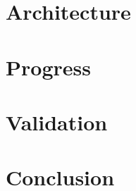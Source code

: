 \documentclass{sig-alternate-05-2015}
\begin{document}
\section{Architecture}
\label{sec:architecture}


\section{Progress}
\label{sec:progress}


\section{Validation}
\label{sec:validation}


\section{Conclusion}
\label{sec:conclusion}







\end{document}

